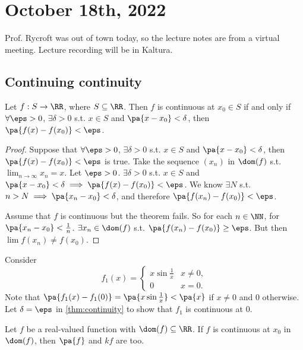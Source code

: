 \documentclass[11pt]{scrartcl}
\numberwithin{equation}{section}
\begin{document}
\section{October 18th, 2022}
Prof. Rycroft was out of town today, 
so the lecture notes are from a virtual meeting.
Lecture recording will be in Kaltura.
\subsection{Continuing continuity}
\begin{theorem}
    \label{thm:continuity}
    Let $f : S \rightarrow \RR$, where $S\subseteq \RR$. Then $f$ 
    is continuous at $x_0\in S$ if and only if $\forall\eps>0$,
    $\exists\delta>0$ s.t. $x\in S$ and $\pa{x-x_0}<\delta$, then 
    $\pa{f(x)-f(x_0)}<\eps$.
\end{theorem}

\begin{proof}
    Suppose that $\forall\eps>0$,
    $\exists\delta>0$ s.t. $x\in S$ and $\pa{x-x_0}<\delta$, then 
    $\pa{f(x)-f(x_0)}<\eps$ is true.
    Take the sequence $(x_n)$ in $\dom(f)$ s.t. $\lim_{n\rightarrow \infty}x_n = x$.
    Let $\eps>0$. $\exists \delta>0$ s.t. $x\in S$ and $\pa{x-x_0} < \delta
    \implies \pa{f(x)-f(x_0)}<\eps$. We know $\exists N$ s.t. 
    $n>N\implies \pa{x_n-x_0} < \delta$, and therefore 
    $\pa{f(x_n)-f(x_0)} < \eps$.

    Assume that $f$ is continuous but the theorem fails.
    So for each $n\in \NN$, for $\pa{x_n-x_0} < \frac{1}{n}$.
    $\exists x_n\in\dom(f)$ s.t. $\pa{f(x_n)-f(x_0)}\geq \eps$.
    But then $\lim f(x_n)\neq f(x_0)$.
\end{proof}

\begin{example}
    Consider \[ f_1(x) = \begin{cases}
        x\sin\frac{1}{x} &x\neq 0, \\
        0 &x=0.
    \end{cases}\]
    Note that $\pa{f_1(x) -f_1(0)} = \pa{x\sin\frac{1}{x}}<\pa{x}$
    if $x\neq 0$ and $0$ otherwise.
    Let $\delta = \eps$ in \cref{thm:continuity} to show that
    $f_1$ is continuous at $0$.
\end{example}

\begin{proposition}
    Let $f$ be a real-valued function with $\dom(f)\subseteq \RR$.
    If $f$ is continuous at $x_0$ in $\dom(f)$, then $\pa{f}$ and 
    $kf$ are too.
\end{proposition}
\end{document}
